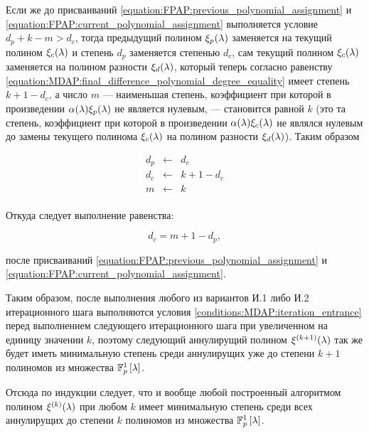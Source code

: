 Если же до присваиваний \eqref{equation:FPAP:previous_polynomial_assignment} и \eqref{equation:FPAP:current_polynomial_assignment} выполняется
условие $d_p + k - m > d_c$, тогда предыдущий полином $\xi_p (\lambda)$ заменяется на текущий полином $\xi_c (\lambda)$ и степень
$d_p$ заменяется степенью $d_c$, сам текущий полином $\xi_c (\lambda)$ заменяется на полином разности $\xi_d (\lambda)$,
который теперь согласно равенству \eqref{equation:MDAP:final_difference_polynomial_degree_equality} имеет степень $k + 1 - d_c$, а число
$m$ --- наименьшая степень, коэффициент при которой в произведении $\alpha (\lambda) \xi_p (\lambda)$ не является нулевым, --- становится
равной $k$ (это та степень, коэффициент при которой в произведении $\alpha (\lambda) \xi_c (\lambda)$ не являлся нулевым
до замены текущего полинома $\xi_c (\lambda)$ на полином разности $\xi_d (\lambda)$). Таким образом

	$$
		\begin{array}{ccc}
			d_p & \leftarrow & d_c \\
			d_c & \leftarrow & k + 1 - d_c \\
			m   & \leftarrow & k \\
		\end{array}
	$$

Откуда следует выполнение равенства:

	$$ d_c = m + 1 - d_p, $$

после присваиваний \eqref{equation:FPAP:previous_polynomial_assignment} и \eqref{equation:FPAP:current_polynomial_assignment}.

Таким образом, после выполнения любого из вариантов И.1 либо И.2 итерационного шага выполняются условия \ref{conditions:MDAP:iteration_entrance}
перед выполнением следующего итерационного шага при увеличенном на единицу значении $k$, поэтому следующий аннулирущий полином
$\xi^{(k+1)} (\lambda)$ так же будет иметь минимальную степень среди аннулирущих уже до степени $k+1$ полиномов из множества $\mathbb{F}_p^1 \left [ \lambda \right ]$.

Отсюда по индукции следует, что и вообще любой построенный алгоритмом полином $\xi^{(k)} (\lambda)$ при любом $k$ имеет минимальную степень
среди всех аннулирущих до степени $k$ полиномов из множества $\mathbb{F}_p^1 \left [ \lambda \right ]$.
